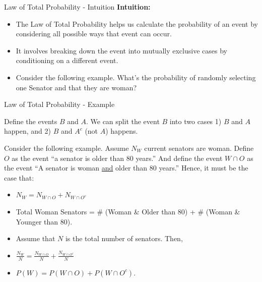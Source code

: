 \documentclass[handout]{beamer} %
\begin{document}
\begin{frame}{Law of Total Probability - Intuition}
    \textbf{Intuition:} \pause
    \begin{itemize}
        \item The Law of Total Probability helps us calculate the probability of an event by considering all possible ways that event can occur.\pause
        \item It involves breaking down the event into mutually exclusive cases by conditioning on a different event.\pause
        \item Consider the following example. What's the probability of randomly selecting one Senator and that they are woman?
    \end{itemize}
\end{frame}

\begin{frame}{Law of Total Probability - Example}

Define the events $B$ and $A$. We can split the event $B$ into two cases 1) $B$ and $A$ happen, and 2) $B$ and $A^c$ (not $A$) happens.  \newline
\vspace{0.5em}


Consider the following example. Assume $N_W$ current senators are woman. Define $O$ as the event ``a senator is older than 80 years.'' And define the event $W \cap O$ as the event ``A senator is woman \underline{and} older than 80 years.'' Hence, it must be the case that:
\begin{itemize}
    \item $N_W = N_{W\cap O} + N_{W\cap O^c}$
    \item Total Woman Senators = \# (Woman \& Older than 80) + \# (Woman \& Younger than 80).
    \item Assume that $N$ is the total number of senators. Then,
    \item $\frac{N_W}{N} = \frac{N_{W\cap O}}{N}+ \frac{N_{W\cap O^c}}{N}$
    \item $P(W) = P(W \cap O) + P(W \cap O^c)$.
\end{itemize}
\end{frame}

\end{document}
